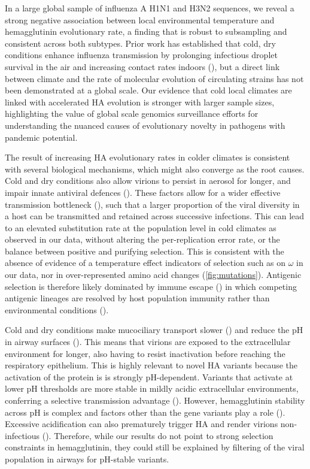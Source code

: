 \documentclass[11pt, a4paper]{article}
\begin{document}
In a large global sample of influenza A H1N1 and H3N2 sequences, we reveal a strong negative association between local environmental temperature and hemagglutinin evolutionary rate, a finding that is robust to subsampling and consistent across both subtypes. Prior work has established that cold, dry conditions enhance influenza transmission by prolonging infectious droplet survival in the air and increasing contact rates indoors (\cite{lowen_influenza_2007, frise_contact_2016}), but a direct link between climate and the rate of molecular evolution of circulating strains has not been demonstrated at a global scale. Our evidence that cold local climates are linked with accelerated HA evolution is stronger with larger sample sizes, highlighting the value of global scale genomics surveillance efforts for understanding the nuanced causes of evolutionary novelty in pathogens with pandemic potential.

The result of increasing HA evolutionary rates in colder climates is consistent with several biological mechanisms, which might also converge as the root causes. Cold and dry conditions also allow virions to persist in aerosol for longer, and impair innate antiviral defences (\cite{lowen_influenza_2007, kudo_low_2019}). These factors allow for a wider effective transmission bottleneck (\cite{sobel_leonard_transmission_2017}), such that a larger proportion of the viral diversity in a host can be transmitted and retained across successive infections. This can lead to an elevated substitution rate at the population level in cold climates as observed in our data, without altering the per-replication error rate, or the balance between positive and purifying selection. This is consistent with the absence of evidence of a temperature effect indicators of selection such as on $\omega$ in our data, nor in over-represented amino acid changes (\ref{fig:mutations}). Antigenic selection is therefore likely dominated by immune escape (\cite{smith_mapping_2004}) in which competing antigenic lineages are resolved by host population immunity rather than environmental conditions (\cite{strelkowa_clonal_2012}).

Cold and dry conditions make mucociliary transport slower (\cite{kelly_rapid_2021, kilgour_mucociliary_2004}) and reduce the pH in airway surfaces (\cite{kudo_low_2019}). This means that virions are exposed to the extracellular environment for longer, also having to resist inactivation before reaching the respiratory epithelium. This is highly relevant to novel HA variants because the activation of the protein is is strongly pH-dependent. Variants that activate at lower pH thresholds are more stable in mildly acidic extracellular environments, conferring a selective transmission advantage (\cite{russier_molecular_2016, singanayagam_influenza_2019}). However, hemagglutinin stability across pH is complex and factors other than the gene variants play a role (\cite{yang_relationship_2021}). Excessive acidification can also prematurely trigger HA and render virions non-infectious (\cite{tosheva_hemagglutinin_2023}). Therefore, while our results do not point to strong selection constraints in hemagglutinin, they could still be explained by filtering of the viral population in airways for pH-stable variants.
\end{document}
